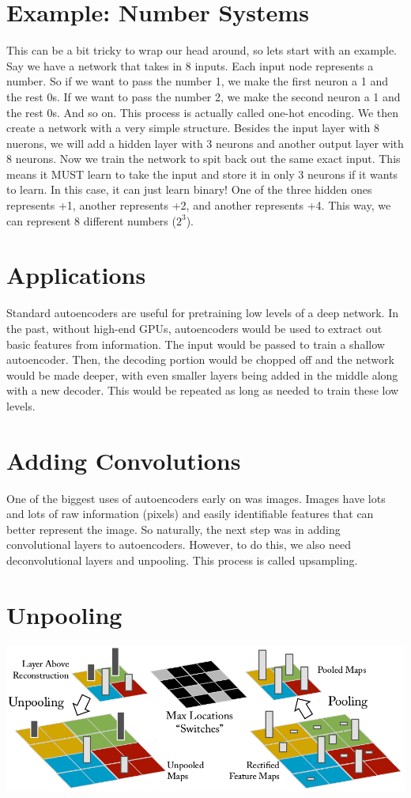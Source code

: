 \documentclass{article}
\begin{document}
\section{Example: Number Systems}
This can be a bit tricky to wrap our head around, so lets start with an example. Say we have a network that takes in 8 inputs. Each input node represents a number. So if we want to pass the number 1, we make the first neuron a 1 and the rest 0s. If we want to pass the number 2, we make the second neuron a 1 and the rest 0s. And so on. This process is actually called one-hot encoding. We then create a network with a very simple structure. Besides the input layer with 8 nuerons, we will add a hidden layer with 3 neurons and another output layer with 8 neurons. Now we train the network to spit back out the same exact input. This means it MUST learn to take the input and store it in only 3 neurons if it wants to learn. In this case, it can just learn binary! One of the three hidden ones represents +1, another represents +2, and another represents +4. This way, we can represent 8 different numbers ($2^3$).

\section{Applications}
Standard autoencoders are useful for pretraining low levels of a deep network. In the past, without high-end GPUs, autoencoders would be used to extract out basic features from information. The input would be passed to train a shallow autoencoder. Then, the decoding portion would be chopped off and the network would be made deeper, with even smaller layers being added in the middle along with a new decoder. This would be repeated as long as needed to train these low levels.

\section{Adding Convolutions}
One of the biggest uses of autoencoders early on was images. Images have lots and lots of raw information (pixels) and easily identifiable features that can better represent the image. So naturally, the next step was in adding convolutional layers to autoencoders. However, to do this, we also need deconvolutional layers and unpooling. This process is called upsampling.

\section{Unpooling}
\begin{center}
\includegraphics[scale=1.0]{unpooling}
\end{center}
\end{document}
